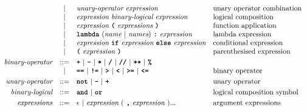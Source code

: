 \[\begin{array}{rcll}
                         & |   & \textit{unary-operator}\ \textit{expression}                                            & \text{unary operator combination}       \\
                         & |   & \textit{expression}\ \textit{binary-logical}\ \textit{expression}                       & \text{logical composition}              \\
                         & |   & \textit{expression}\ \textbf{\texttt{(}}\ \textit{expressions}\ \textbf{\texttt{)}}                           & \text{function application}             \\
                         & |   & \textbf{\texttt{lambda}}\ (\textit{name}\ |\ \textit{names})\ \textbf{\texttt{:}}\ \textit{expression}        & \text{lambda expression}                \\
                         & |   & \textit{expression}\ \textbf{\texttt{if}}\ \textit{expression}\ \textbf{\texttt{else}}\ \textit{expression}   & \text{conditional expression}           \\
                         & |   & \textbf{\texttt{(}}\ \textit{expression}\ \textbf{\texttt{)}}                                                 & \text{parenthesised expression}         \\[1mm]
\textit{binary-operator} & ::= & \textbf{\texttt{+}}\ |\ \textbf{\texttt{-}}\ |\ \textbf{\texttt{*}}\ |\ \textbf{\texttt{/}}\ |\ \textbf{\texttt{//}}\ |\ \textbf{\texttt{**}}\ |\ \textbf{\texttt{\%}}             &                                         \\
                         & |   & \textbf{\texttt{==}}\ |\ \textbf{\texttt{!=}}\ |\ \textbf{\texttt{>}}\ |\ \textbf{\texttt{<}}\ |\ \textbf{\texttt{>=}}\ |\ \textbf{\texttt{<=}}           & \text{binary operator}                  \\[1mm]
\textit{unary-operator}  & ::= & \textbf{\texttt{not}}\ |\ \textbf{\texttt{-}}\ |\ \textbf{\texttt{+}}                                                    & \text{unary operator}                   \\[1mm]
\textit{binary-logical}  & ::= & \textbf{\texttt{and}}\ |\ \textbf{\texttt{or}}                                                                & \text{logical composition symbol}       \\[1mm]
\textit{expressions}     & ::= & \epsilon\ |\ \textit{expression}\ (\ \textbf{\texttt{,}}\ \textit{expression}\ )...                & \text{argument expressions}             \\

\end{array}\]
